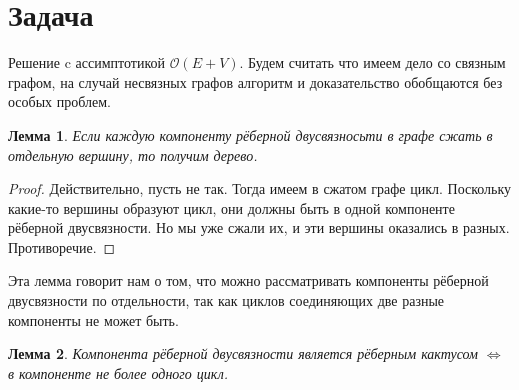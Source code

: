 \documentclass{article}
\newtheorem{lemma}{Лемма}
\newcommand{\complexity}[1]{$\mathcal{O}(#1)$}
\begin{document}
\section*{Задача }
Решение c ассимптотикой \complexity{E + V}.
    \newline
    \newline
    Будем считать что имеем дело со связным графом, на случай несвязных графов алгоритм и доказательство обобщаются без особых проблем.
    \begin{lemma}
        Если каждую компоненту рёберной двусвязносьти в графе сжать в отдельную вершину, то получим дерево.
    \end{lemma}%
    \begin{proof}
        Действительно, пусть не так. Тогда имеем в сжатом графе цикл. Поскольку какие-то вершины образуют цикл, они должны быть в одной компоненте рёберной двусвязности. Но мы уже сжали их, и эти вершины оказались в разных. Противоречие.
    \end{proof}
    Эта лемма говорит нам о том, что можно рассматривать компоненты рёберной двусвязности по отдельности, так как циклов соединяющих две разные компоненты не может быть.
    \begin{lemma}
        Компонента рёберной двусвязности является рёберным кактусом $\Leftrightarrow$ в компоненте не более одного цикл.
    \end{lemma}
\end{document}
